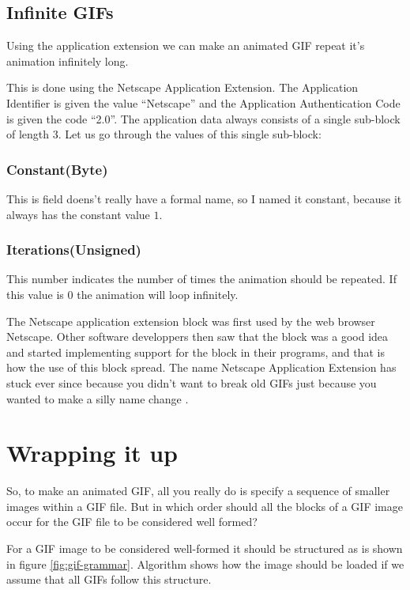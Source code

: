 \begin{refsection}
  \subsection{Infinite GIFs}

  Using the application extension we can make an animated GIF repeat
  it's animation infinitely long.

  This is done using the Netscape Application Extension. The
  Application Identifier is given the value ``Netscape'' and the
  Application Authentication Code is given the code ``2.0''. The
  application data always consists of a single sub-block of length
  3. Let us go through the values of this single sub-block:
  \cite{frazier97:_all_about_gif89}

  \subsubsection{Constant(Byte)}

  This is field doens't really have a formal name, so I named it
  constant, because it always has the constant value $1$.

  \subsubsection{Iterations(Unsigned)}

  This number indicates the number of times the animation should be
  repeated. If this value is $0$ the animation will loop infinitely.

  The Netscape application extension block was first used by the web
  browser Netscape. Other software developpers then saw that the block
  was a good idea and started implementing support for the block in
  their programs, and that is how the use of this block spread. The
  name Netscape Application Extension has stuck ever since because you
  didn't want to break old GIFs just because you wanted to make a
  silly name change \cite{walte96:_web_scrip_secret_weapon}.

  \section{Wrapping it up}

  So, to make an animated GIF, all you really do is specify a sequence
  of smaller images within a GIF file. But in which order should all
  the blocks of a GIF image occur for the GIF file to be considered
  well formed?

  For a GIF image to be considered well-formed it should be structured
  as is shown in figure \ref{fig:gif-grammar}. Algorithm shows how the
  image should be loaded if we assume that all GIFs follow this
  structure.


\end{refsection}
